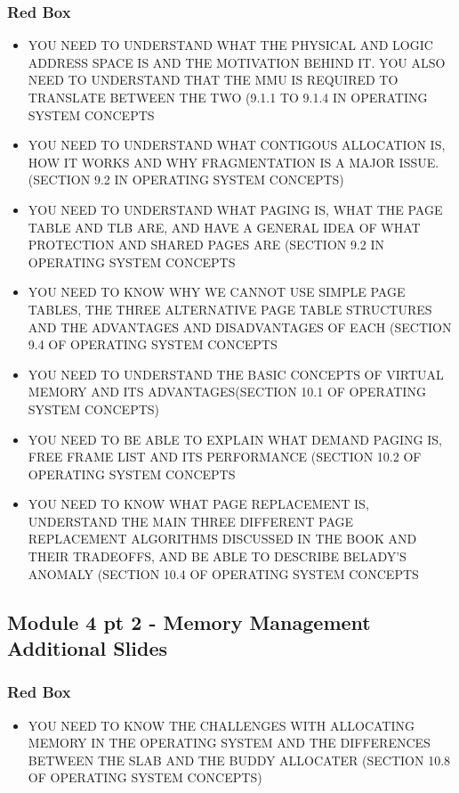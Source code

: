 \documentclass{article}
\begin{document}
\subsubsection{Red Box}
\begin{itemize}
    \item YOU NEED TO UNDERSTAND WHAT THE PHYSICAL AND LOGIC ADDRESS SPACE IS AND THE MOTIVATION BEHIND IT. YOU ALSO NEED TO UNDERSTAND THAT
    THE MMU IS REQUIRED TO TRANSLATE BETWEEN THE TWO (9.1.1 TO 9.1.4 IN OPERATING SYSTEM CONCEPTS
    \item YOU NEED TO UNDERSTAND WHAT CONTIGOUS ALLOCATION IS, HOW IT WORKS AND WHY FRAGMENTATION IS A MAJOR ISSUE.
    (SECTION 9.2 IN OPERATING SYSTEM CONCEPTS)
    \item YOU NEED TO UNDERSTAND WHAT PAGING IS, WHAT THE PAGE TABLE AND TLB ARE, AND HAVE A GENERAL IDEA OF WHAT PROTECTION AND SHARED
    PAGES ARE (SECTION 9.2 IN OPERATING SYSTEM CONCEPTS
    \item YOU NEED TO KNOW WHY WE CANNOT USE SIMPLE PAGE TABLES, THE THREE ALTERNATIVE PAGE TABLE STRUCTURES AND THE ADVANTAGES AND
    DISADVANTAGES OF EACH (SECTION 9.4 OF OPERATING SYSTEM CONCEPTS
    \item YOU NEED TO UNDERSTAND THE BASIC CONCEPTS OF VIRTUAL MEMORY AND ITS ADVANTAGES(SECTION 10.1 OF OPERATING SYSTEM CONCEPTS)
    \item YOU NEED TO BE ABLE TO EXPLAIN WHAT DEMAND PAGING IS, FREE FRAME LIST AND ITS PERFORMANCE (SECTION 10.2 OF OPERATING SYSTEM CONCEPTS
    \item YOU NEED TO KNOW WHAT PAGE REPLACEMENT IS, UNDERSTAND THE MAIN THREE DIFFERENT PAGE REPLACEMENT ALGORITHMS DISCUSSED IN THE BOOK
    AND THEIR TRADEOFFS, AND BE ABLE TO DESCRIBE BELADY’S ANOMALY (SECTION 10.4 OF OPERATING SYSTEM CONCEPTS
\end{itemize}



\subsection{Module 4 pt 2 - Memory Management Additional Slides}
\subsubsection{Red Box}
\begin{itemize}
    \item YOU NEED TO KNOW THE CHALLENGES WITH ALLOCATING MEMORY IN THE OPERATING SYSTEM AND THE DIFFERENCES BETWEEN THE SLAB AND THE BUDDY
    ALLOCATER (SECTION 10.8 OF OPERATING SYSTEM CONCEPTS)
\end{itemize}
\end{document}
